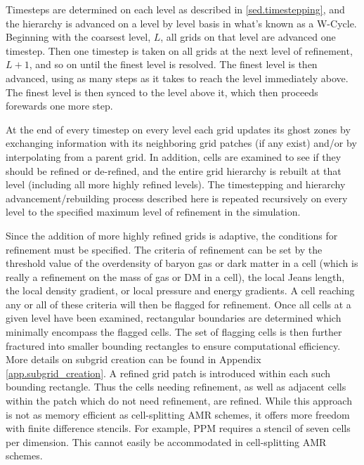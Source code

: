 Timesteps are determined on each level as
described in \ref{sed.timestepping}, and the hierarchy is advanced on
a level by level basis in what's known as a W-Cycle.    Beginning with
the coarsest level, $L$, all grids on that level are advanced one
timestep.  Then one timestep is taken on all grids at the next level
of refinement, $L+1$, and so on until the finest level is resolved.
The finest level is then advanced, using as many steps as it takes to
reach the level immediately above.  The finest level is then synced
to the level above it, which then proceeds forewards one more step.

At the end of every timestep on every level each grid updates 
its ghost zones by exchanging information with its neighboring grid patches 
(if any exist) and/or by interpolating from a parent grid.  
In addition, cells are examined to see if they should be refined or 
de-refined, and the entire grid hierarchy is rebuilt at that 
level (including all more highly refined levels).  The timestepping and 
hierarchy advancement/rebuilding process described here is repeated 
recursively on every level to the specified maximum level of 
refinement in the simulation. 

Since the addition of more highly refined grids is adaptive,  
the conditions for refinement must be specified.  The criteria of 
refinement can be set by the threshold value of the overdensity of 
baryon gas or dark matter in a cell (which is really a refinement on
the mass of gas or DM in a cell), the local Jeans length, the 
local density gradient, or local pressure and energy gradients.  
A cell reaching any or all of these criteria 
will then be flagged for refinement.  
Once all cells at a given level have been examined, rectangular boundaries 
are determined which minimally encompass the flagged cells. The set of
flagging cells is then further fractured into smaller bounding
rectangles to ensure computational 
efficiency.  More details on subgrid creation can be found in Appendix
\ref{app.subgrid_creation}.  A refined grid patch is 
introduced within each such bounding rectangle. Thus the cells needing 
refinement, as well as adjacent cells within the patch which do not need 
refinement, are refined. While this approach is not as memory efficient as 
cell-splitting AMR schemes, it offers more freedom with 
finite difference stencils. For example, PPM requires a stencil of seven 
cells per dimension. This cannot easily be accommodated in cell-splitting 
AMR schemes. 


